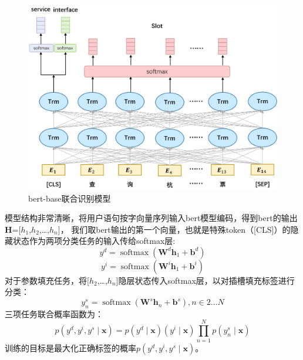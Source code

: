 \begin{figure}[htbp]
  \centering
  \includegraphics[width=13cm]{./images/bert-base.jpg}
  \caption{bert-base联合识别模型}
  \label{fig:bert-base}
\end{figure}

模型结构非常清晰，将用户语句按字向量序列输入bert模型编码，得到bert的输出$\mathbf{H}$=[$h_{1}$,$h_{2}$,\dots,$h_{n}$]，
我们取bert输出的第一个向量，也就是特殊token（[CLS]）的隐藏状态作为两项分类任务的输入传给softmax层:
\begin{equation}
  y^{d}=\operatorname{softmax}\left(\mathbf{W}^{d} \boldsymbol{h}_{1}+\boldsymbol{b}^{d}\right)
\end{equation}
\begin{equation}
  y^{i}=\operatorname{softmax}\left(\mathbf{W}^{i} \boldsymbol{h}_{1}+\boldsymbol{b}^{i}\right)
\end{equation}
对于参数填充任务，将[$h_{2}$,\dots,$h_{n}$]隐层状态传入softmax层，以对插槽填充标签进行分类：
\begin{equation}
y_{n}^{s}=\operatorname{softmax}\left(\mathbf{W}^{s} \boldsymbol{h}_{n}+\boldsymbol{b}^{s}\right), n \in 2 \ldots N
\end{equation}
三项任务联合概率函数为：
\begin{equation}
  p\left(y^{d},y^{i}, y^{s} \mid \boldsymbol{x}\right)=p\left(y^{d} \mid \boldsymbol{x}\right) \left(y^{i} \mid \boldsymbol{x}\right) \prod_{n=1}^{N} p\left(y_{n}^{s} \mid \boldsymbol{x}\right)
  \end{equation}
  训练的目标是最大化正确标签的概率$p\left(y^{d},y^{i}, y^{s} \mid \boldsymbol{x}\right)$。

